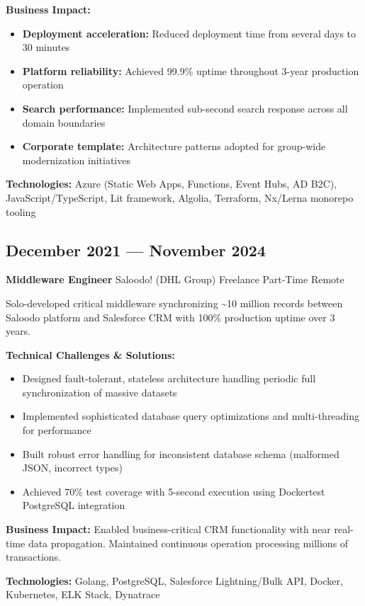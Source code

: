 \documentclass[10pt,a4paper]{article}
\newcommand{\role}[4]{\subsection{#1}\textbf{#2} \textbar{} #3 \textbar{} #4\vspace{2pt}}
\begin{document}
\textbf{Business Impact:}
\begin{itemize}[leftmargin=12pt,itemsep=1pt]
\item \textbf{Deployment acceleration:} Reduced deployment time from several days to 30 minutes
\item \textbf{Platform reliability:} Achieved 99.9\% uptime throughout 3-year production operation
\item \textbf{Search performance:} Implemented sub-second search response across all domain boundaries
\item \textbf{Corporate template:} Architecture patterns adopted for group-wide modernization initiatives
\end{itemize}

\textbf{Technologies:} Azure (Static Web Apps, Functions, Event Hubs, AD B2C), JavaScript/TypeScript, Lit framework, Algolia, Terraform, Nx/Lerna monorepo tooling

\newpage

\role{December 2021 — November 2024}{Middleware Engineer}{Saloodo! (DHL Group)}{Freelance \textbar{} Part-Time \textbar{} Remote}

Solo-developed critical middleware synchronizing \textasciitilde{}10 million records between Saloodo platform and Salesforce CRM with 100\% production uptime over 3 years.

\textbf{Technical Challenges \& Solutions:}
\begin{itemize}[leftmargin=12pt,itemsep=1pt]
\item Designed fault-tolerant, stateless architecture handling periodic full synchronization of massive datasets
\item Implemented sophisticated database query optimizations and multi-threading for performance
\item Built robust error handling for inconsistent database schema (malformed JSON, incorrect types)
\item Achieved 70\% test coverage with 5-second execution using Dockertest PostgreSQL integration
\end{itemize}

\textbf{Business Impact:} Enabled business-critical CRM functionality with near real-time data propagation. Maintained continuous operation processing millions of transactions.

\textbf{Technologies:} Golang, PostgreSQL, Salesforce Lightning/Bulk API, Docker, Kubernetes, ELK Stack, Dynatrace

\vspace{4pt}
\end{document}
